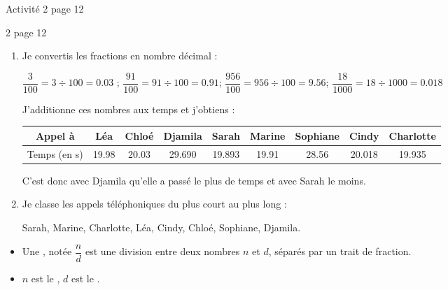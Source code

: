 



\begin{myact}{3}
	Activité 2 page 12
\end{myact}


\begin{myactrep}{2 page 12}
	\begin{enumerate}
		\item Je convertis les fractions en nombre décimal :
		
		$ \dfrac{3}{100} = 3 \div 100 = \num{0.03}$ ; $\dfrac{91}{100} = 91 \div 100 = \num{0.91}$; $\dfrac{956}{100} = 956 \div 100 = \num{9.56}$; $\dfrac{18}{1000} = 18 \div 1000 = \num{0.018}$
		
		J'additionne ces nombres aux temps et j'obtiens :
		
		\begin{tabular}{|@{\ }c@{\ }|@{\ }c@{\ }|@{\ }c@{\ }|@{\ }c@{\ }|@{\ }c@{\ }|@{\ }c@{\ }|@{\ }c@{\ }|@{\ }c@{\ }|@{\ }c@{\ }|}
			\hline
			Appel à      & Léa         & Chloé       & Djamila      & Sarah        & Marine      & Sophiane    & Cindy        & Charlotte    \\ \hline
			Temps (en s) & \num{19.98} & \num{20.03} & \num{29.690} & \num{19.893} & \num{19.91} & \num{28.56} & \num{20.018} & \num{19.935} \\ \hline
		\end{tabular}
		
		C'est donc avec Djamila qu'elle a passé le plus de temps et avec Sarah le moins.
		
		\item Je classe les appels téléphoniques du plus court au plus long :
		
		Sarah, Marine, Charlotte, Léa, Cindy, Chloé, Sophiane, Djamila.
	\end{enumerate}
\end{myactrep}

\begin{mydef}
	\begin{itemize}
		\item Une , notée $\dfrac{n}{d}$ est une division entre deux nombres $n$ et $d$, séparés par un trait de fraction.
		
		\item $n$ est le  , $d$ est le .
	\end{itemize}

	
	
\end{mydef}


